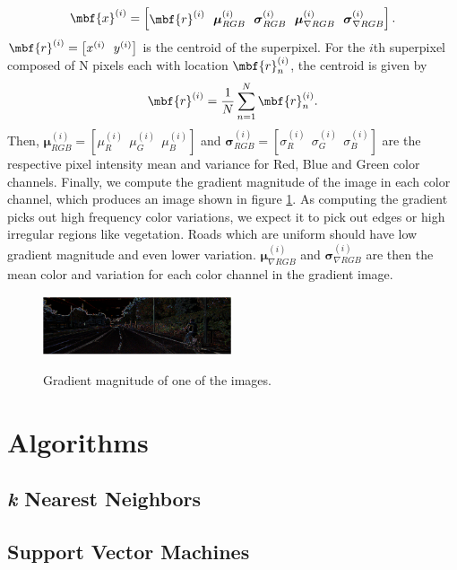 \documentclass{article} %
\newcommand{\bs}[1]{\boldsymbol{#1}}
\begin{document}
\begin{equation}
 \mbf{x}^{(i)} = 
 \begin{bmatrix}\mbf{r}^{(i)}~~\bs{\mu}_{RGB}^{(i)}~~\bs{\sigma}_{RGB}^{(i)}~~\bs{\mu}_{\nabla RGB}^{(i)}~~\bs{\sigma}_{\nabla RGB}^{(i)}  \end{bmatrix}.
\end{equation}
$\mbf{r}^{(i)}=\left[x^{(i)}~~ y^{(i)}\right]$ is the centroid of the superpixel. For the $i$th superpixel composed of N pixels each with location $\mbf{r}^{(i)}_n$, the centroid is given by
\begin{equation}
 \mbf{r}^{(i)} = \frac{1}{N}\sum_{n=1}^N \mbf{r}^{(i)}_n.
\end{equation}
Then, $\bs{\mu}_{RGB}^{(i)} = \left[\mu_{R}^{(i)}~~\mu_{G}^{(i)} ~~\mu_{B}^{(i)}  \right]$ and $\bs{\sigma}_{RGB}^{(i)} = \left[\sigma_{R}^{(i)}~~\sigma_{G}^{(i)} ~~\sigma_{B}^{(i)}  \right]$ are the respective pixel intensity mean and variance for Red, Blue and Green color channels. Finally, we compute the gradient magnitude of the image in each color channel, which produces an image shown in figure \ref{fig:grad}. As computing the gradient picks out high frequency color variations, we expect it to pick out edges or high irregular regions like vegetation. Roads which are uniform should have low gradient magnitude and even lower variation. $\bs{\mu}_{\nabla RGB}^{(i)}$ and $\bs{\sigma}_{\nabla RGB}^{(i)}$ are then the mean color and variation for each color channel in the gradient image.
\begin{figure}[ht!]
\centering
 \includegraphics[width=0.5\textwidth]{figs/grad.pdf}\\
 \caption{Gradient magnitude of one of the images.}\label{fig:grad}
\end{figure}



\section{Algorithms}
\subsection{\textit{k} Nearest Neighbors}
\subsection{Support Vector Machines}
\end{document}
